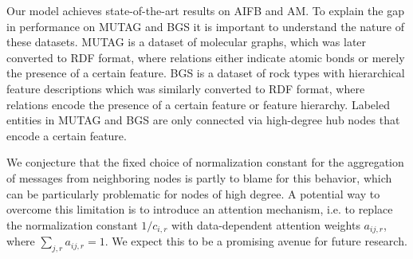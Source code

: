 Our model achieves state-of-the-art results on AIFB and AM. To explain the gap in performance on MUTAG and BGS it is important to understand the nature of these datasets. MUTAG is a dataset of molecular graphs, which was later converted to RDF format, where relations either indicate atomic bonds or merely the presence of a certain feature. BGS is a dataset of rock types with hierarchical feature descriptions which was similarly converted to RDF format, where relations encode the presence of a certain feature or feature hierarchy. Labeled entities in MUTAG and BGS are only connected via high-degree hub nodes that encode a certain feature.

We conjecture that the fixed choice of normalization constant for the aggregation of messages from neighboring nodes is partly to blame for this behavior, which can be particularly problematic for nodes of high degree. A potential way to overcome this limitation is to introduce an attention mechanism, i.e. to replace the normalization constant $1/c_{i,r}$ with data-dependent attention weights $a_{ij,r}$, where $\sum_{j,r}a_{ij,r}=1$. We expect this to be a promising avenue for future research.
